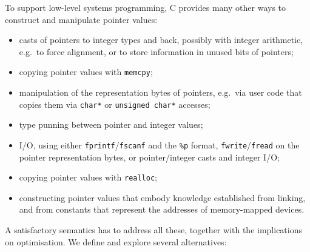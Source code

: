 \documentclass[acmsmall,review,screen]{acmart}\settopmatter{printfolios=true,printccs=false,printacmref=false}
\begin{document}
To support low-level systems programming, C provides many other ways
to construct and manipulate pointer values:
%
\begin{itemize}
\item 
casts of pointers to integer types and back, possibly with integer
arithmetic, e.g.~to force alignment, or to store information in unused
bits of pointers;

\item
copying pointer values with \lstinline{memcpy};

\item
manipulation of the representation bytes of pointers, e.g.~via user
code that copies them via \lstinline{char*} or \lstinline{unsigned char*} accesses;

\item
type punning between pointer and integer values; 

\item
I/O, using either \lstinline{fprintf}/\lstinline{fscanf} and
the \lstinline{%p} format,  \lstinline{fwrite}/\lstinline{fread} on
the pointer representation bytes, or pointer/integer casts and
integer I/O;

\item
copying pointer values with \lstinline{realloc};

\item
constructing pointer values that embody knowledge established from
linking, and from constants that represent the addresses of
memory-mapped devices. 
\end{itemize}
%
A satisfactory semantics has to address all these, together with the
implications on optimisation.   We define and explore several 
 alternatives:
\end{document}
